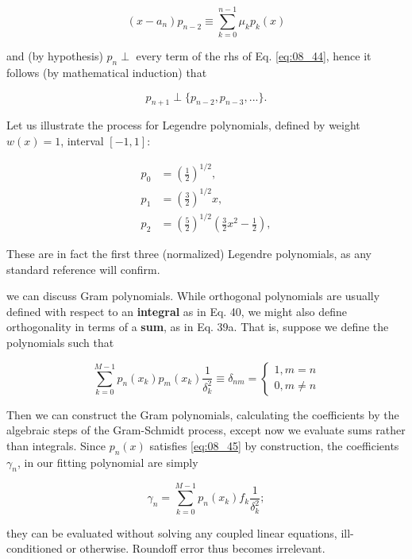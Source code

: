 \begin{equation}\label{eq:08_44}
(x - a_{n}) p_{n-2} \equiv \sum_{k=0}^{n-1} \mu_{k} p_{k}(x)
\end{equation}

and (by hypothesis) $p_{n} \perp$ every term of the rhs of Eq. \ref{eq:08_44}, hence it follows (by mathematical induction) that

\begin{equation}
p_{n+1} \perp \{ p_{n-2} , p_{n-3} , ... \}.
\end{equation}

Let us illustrate the process for Legendre polynomials, defined by weight $w(x) = 1$, interval $[-1,1]$:

\begin{align*}
p_{0} & = (\frac{1}{2})^{1/2} , \\
p_{1} & = (\frac{3}{2})^{1/2} x , \\
p_{2} & = (\frac{5}{2})^{1/2} (\frac{3}{2}x^{2} - \frac{1}{2}) ,
\end{align*}

These are in fact the first three (normalized) Legendre polynomials, as any standard reference will confirm.

 we can discuss Gram polynomials. While orthogonal polynomials are usually defined with respect to an \textbf{integral} as in Eq. 40, we might also define orthogonality in terms of a \textbf{sum}, as in Eq. 39a. That is, suppose we define the polynomials such that

\begin{equation}\label{eq:08_45}
\sum_{k=0}^{M-1}p_{n}(x_{k})p_{m}(x_{k})\frac{1}{\delta_{k}^{2}} \equiv \delta_{nm} =
    \begin{cases}
        1, m   = n \\
        0, m \ne n 
    \end{cases}
\end{equation}

Then we can construct the Gram polynomials, calculating the
coefficients by the algebraic steps of the Gram-Schmidt process, except now we evaluate sums rather than integrals. Since $p_{n}(x)$ satisfies \ref{eq:08_45} by construction, the coefficients $\gamma_{n}$, in our fitting polynomial are simply

\begin{equation}
\gamma_{n} = \sum_{k=0}^{M-1} p_{n}(x_{k})f_{k}\frac{1}{\delta_{k}^{2}} ;
\end{equation}

they can be evaluated without solving any coupled linear equations, ill-conditioned or otherwise. Roundoff error thus becomes irrelevant.

